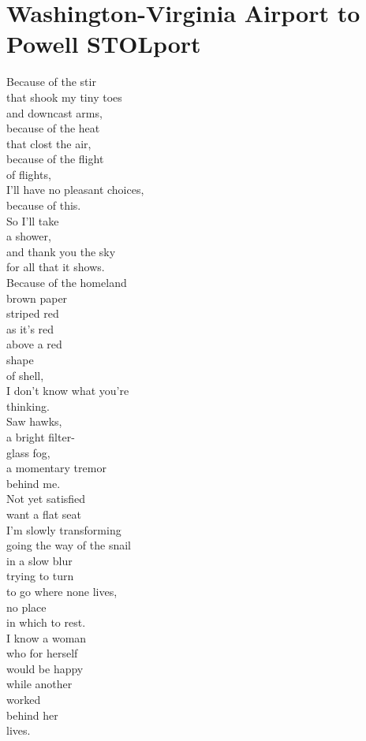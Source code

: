 \documentclass[smalldemyvopaper,11pt,twoside,onecolumn,openright,extrafontsizes]{memoir}
\begin{document}
\chapter{Washington-Virginia Airport to Powell STOLport}
Because of the stir
\\that shook my tiny toes
\\and downcast arms,
\\because of the heat
\\that clost the air,
\\because of the flight
\\of flights,
\\I'll have no pleasant choices,
\\because of this.
\\So I'll take
\\a shower,
\\and thank you the sky
\\for all that it shows.
\\Because of the homeland
\\brown paper
\\striped red
\\as it's red
\\above a red
\\shape
\\of shell,
\\I don't know what you're
\\thinking.
\\Saw hawks,
\\a bright filter-
\\glass fog,
\\a momentary tremor
\\behind me.
\\Not yet satisfied
\\want a flat seat
\\I'm slowly transforming
\\going the way of the snail
\\in a slow blur
\\trying to turn
\\to go where none lives,
\\no place
\\in which to rest.
\\I know a woman
\\who for herself
\\would be happy
\\while another
\\worked
\\behind her
\\lives.
\end{document}
